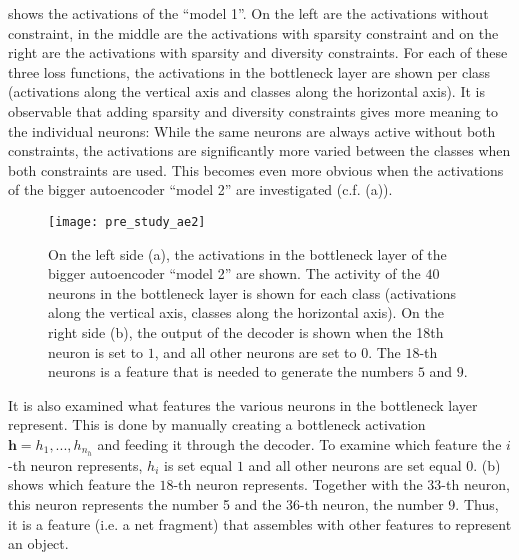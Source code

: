  shows the activations of the ``model 1''.
On the left are the activations without constraint, in the middle are the activations with sparsity constraint and on the right are the activations with sparsity and diversity constraints.
For each of these three loss functions, the activations in the bottleneck layer are shown per class (activations along the vertical axis and classes along the horizontal axis).
It is observable that adding sparsity and diversity constraints gives more meaning to the individual neurons: While the same neurons are always active  without both constraints, the activations are significantly more varied between the classes when both constraints are used.
This becomes even more obvious when the activations of the bigger autoencoder ``model 2'' are investigated (c.f.  (a)).

\begin{figure}[h]
    \centering
    \texttt{[image: pre\_study\_ae2]}
    \caption[Network activations of the bigger autoencoder model]{On the left side (a), the activations in the bottleneck layer of the bigger autoencoder ``model 2'' are shown. The activity of the $40$ neurons in the bottleneck layer is shown for each class (activations along the vertical axis, classes along the horizontal axis). On the right side (b), the output of the decoder is shown when the 18th neuron is set to $1$, and all other neurons are set to $0$. The $18$-th neurons is a feature that is needed to generate the numbers $5$ and $9$.}
\end{figure}

It is also examined what features the various neurons in the bottleneck layer represent.
This is done by manually creating a bottleneck activation $\boldsymbol{h} = h_1, ..., h_{n_h}$ and feeding it through the decoder.
To examine which feature the $i$-th neuron represents, $h_i$ is set equal $1$ and all other neurons are set equal $0$.
 (b) shows which feature the $18$-th neuron represents. Together with the $33$-th neuron, this neuron represents the number 5 and the $36$-th neuron, the number 9.
Thus, it is a feature (i.e. a net fragment) that assembles with other features to represent an object.

